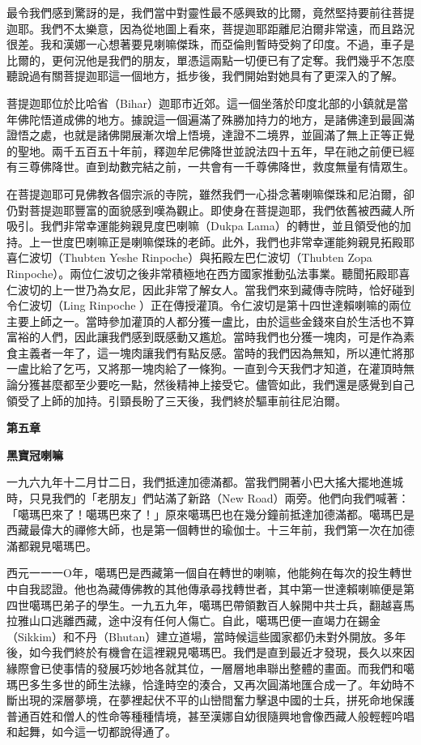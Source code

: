 最令我們感到驚訝的是，我們當中對靈性最不感興致的比爾，竟然堅持要前往菩提迦耶。我們不太樂意，因為從地圖上看來，菩提迦耶距離尼泊爾非常遠，而且路況很差。我和漢娜一心想著要見喇嘛傑珠，而亞倫則暫時受夠了印度。不過，車子是比爾的，更何況他是我們的朋友，單憑這兩點一切便已有了定奪。我們幾乎不怎麼聽說過有關菩提迦耶這一個地方，抵步後，我們開始對她具有了更深入的了解。

菩提迦耶位於比哈省（Bihar）迦耶市近郊。這一個坐落於印度北部的小鎮就是當年佛陀悟道成佛的地方。據說這一個遍滿了殊勝加持力的地方，是諸佛達到最圓滿證悟之處，也就是諸佛開展漸次增上悟境，達證不二境界，並圓滿了無上正等正覺的聖地。兩千五百五十年前，釋迦牟尼佛降世並說法四十五年，早在祂之前便已經有三尊佛降世。直到劫數完結之前，一共會有一千尊佛降世，救度無量有情眾生。

在菩提迦耶可見佛教各個宗派的寺院，雖然我們一心掛念著喇嘛傑珠和尼泊爾，卻仍對菩提迦耶豐富的面貌感到嘆為觀止。即使身在菩提迦耶，我們依舊被西藏人所吸引。我們非常幸運能夠親見度巴喇嘛（Dukpa
Lama）的轉世，並且領受他的加持。上一世度巴喇嘛正是喇嘛傑珠的老師。此外，我們也非常幸運能夠親見拓殿耶喜仁波切（Thubten
Yeshe Rinpoche）與拓殿左巴仁波切（Thubten Zopa
Rinpoche）。兩位仁波切之後非常積極地在西方國家推動弘法事業。聽聞拓殿耶喜仁波切的上一世乃為女尼，因此非常了解女人。當我們來到藏傳寺院時，恰好碰到令仁波切（Ling
Rinpoche
）正在傳授灌頂。令仁波切是第十四世達賴喇嘛的兩位主要上師之一。當時參加灌頂的人都分獲一盧比，由於這些金錢來自於生活也不算富裕的人們，因此讓我們感到既感動又尷尬。當時我們也分獲一塊肉，可是作為素食主義者一年了，這一塊肉讓我們有點反感。當時的我們因為無知，所以連忙將那一盧比給了乞丐，又將那一塊肉給了一條狗。一直到今天我們才知道，在灌頂時無論分獲甚麼都至少要吃一點，然後精神上接受它。儘管如此，我們還是感覺到自己領受了上師的加持。引頸長盼了三天後，我們終於驅車前往尼泊爾。

\textbf{第五章}

\textbf{黑寶冠喇嘛}

一九六九年十二月廿二日，我們抵達加德滿都。當我們開著小巴大搖大擺地進城時，只見我們的「老朋友」們站滿了新路（New
Road）兩旁。他們向我們喊著：「噶瑪巴來了！噶瑪巴來了！」原來噶瑪巴也在幾分鐘前抵達加德滿都。噶瑪巴是西藏最偉大的禪修大師，也是第一個轉世的瑜伽士。十三年前，我們第一次在加德滿都親見噶瑪巴。

西元一一一Ο年，噶瑪巴是西藏第一個自在轉世的喇嘛，他能夠在每次的投生轉世中自我認證。他也為藏傳佛教的其他傳承尋找轉世者，其中第一世達賴喇嘛便是第四世噶瑪巴弟子的學生。一九五九年，噶瑪巴帶領數百人躲開中共士兵，翻越喜馬拉雅山口逃離西藏，途中沒有任何人傷亡。自此，噶瑪巴便一直竭力在錫金（Sikkim）和不丹（Bhutan）建立道場，當時候這些國家都仍未對外開放。多年後，如今我們終於有機會在這裡親見噶瑪巴。我們是直到最近才發現，長久以來因緣際會已使事情的發展巧妙地各就其位，一層層地串聯出整體的畫面。而我們和噶瑪巴多生多世的師生法緣，恰逢時空的湊合，又再次圓滿地匯合成一了。年幼時不斷出現的深層夢境，在夢裡起伏不平的山巒間奮力擊退中國的士兵，拼死命地保護普通百姓和僧人的性命等種種情境，甚至漢娜自幼很隨興地會像西藏人般輕輕吟唱和起舞，如今這一切都說得通了。

